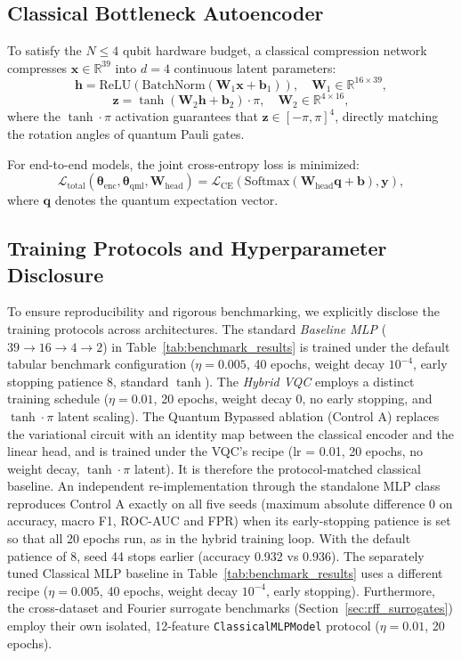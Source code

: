 \documentclass[conference]{IEEEtran}
\begin{document}
\subsection{Classical Bottleneck Autoencoder}
To satisfy the $N \le 4$ qubit hardware budget, a classical compression network compresses $\mathbf{x} \in \mathbb{R}^{39}$ into $d=4$ continuous latent parameters:
\begin{equation}
\mathbf{h} = \text{ReLU}(\text{BatchNorm}(\mathbf{W}_1 \mathbf{x} + \mathbf{b}_1)), \quad \mathbf{W}_1 \in \mathbb{R}^{16 \times 39},
\end{equation}
\begin{equation}
\mathbf{z} = \tanh(\mathbf{W}_2 \mathbf{h} + \mathbf{b}_2) \cdot \pi, \quad \mathbf{W}_2 \in \mathbb{R}^{4 \times 16},
\end{equation}
where the $\tanh \cdot \pi$ activation guarantees that $\mathbf{z} \in [-\pi, \pi]^4$, directly matching the rotation angles of quantum Pauli gates.

For end-to-end models, the joint cross-entropy loss is minimized:
\begin{equation}
\mathcal{L}_{\text{total}}(\boldsymbol{\theta}_{\text{enc}}, \boldsymbol{\theta}_{\text{qml}}, \mathbf{W}_{\text{head}}) = \mathcal{L}_{\text{CE}}(\text{Softmax}(\mathbf{W}_{\text{head}} \mathbf{q} + \mathbf{b}), \mathbf{y}),
\end{equation}
where $\mathbf{q}$ denotes the quantum expectation vector.

\subsection{Training Protocols and Hyperparameter Disclosure}
To ensure reproducibility and rigorous benchmarking, we explicitly disclose the training protocols across architectures. The standard \textit{Baseline MLP} ($39 \to 16 \to 4 \to 2$) in Table~\ref{tab:benchmark_results} is trained under the default tabular benchmark configuration ($\eta = 0.005$, 40 epochs, weight decay $10^{-4}$, early stopping patience 8, standard $\tanh$). The \textit{Hybrid VQC} employs a distinct training schedule ($\eta = 0.01$, 20 epochs, weight decay $0$, no early stopping, and $\tanh \cdot \pi$ latent scaling). The Quantum Bypassed ablation (Control A) replaces the variational circuit with an identity map between the classical encoder and the linear head, and is trained under the VQC's recipe (lr = 0.01, 20 epochs, no weight decay, $\tanh \cdot \pi$ latent). It is therefore the protocol-matched classical baseline. An independent re-implementation through the standalone MLP class reproduces Control A exactly on all five seeds (maximum absolute difference 0 on accuracy, macro F1, ROC-AUC and FPR) when its early-stopping patience is set so that all 20 epochs run, as in the hybrid training loop. With the default patience of 8, seed 44 stops earlier (accuracy 0.932 vs 0.936). The separately tuned Classical MLP baseline in Table~\ref{tab:benchmark_results} uses a different recipe ($\eta = 0.005$, 40 epochs, weight decay $10^{-4}$, early stopping). Furthermore, the cross-dataset and Fourier surrogate benchmarks (Section~\ref{sec:rff_surrogates}) employ their own isolated, 12-feature \texttt{ClassicalMLPModel} protocol ($\eta = 0.01$, 20 epochs).
\end{document}
